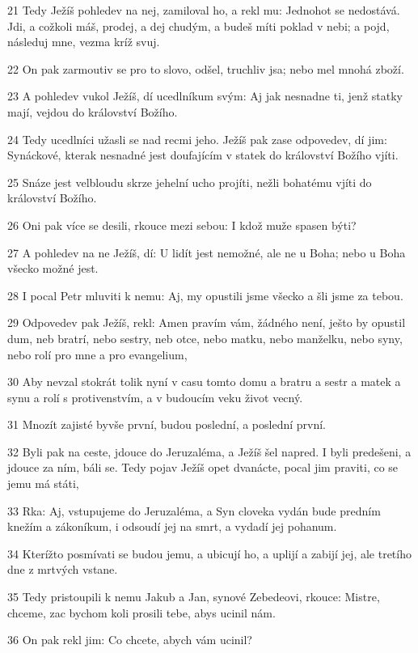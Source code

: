 \par 21 Tedy Ježíš pohledev na nej, zamiloval ho, a rekl mu: Jednohot se nedostává. Jdi, a cožkoli máš, prodej, a dej chudým, a budeš míti poklad v nebi; a pojd, následuj mne, vezma kríž svuj.
\par 22 On pak zarmoutiv se pro to slovo, odšel, truchliv jsa; nebo mel mnohá zboží.
\par 23 A pohledev vukol Ježíš, dí ucedlníkum svým: Aj jak nesnadne ti, jenž statky mají, vejdou do království Božího.
\par 24 Tedy ucedlníci užasli se nad recmi jeho. Ježíš pak zase odpovedev, dí jim: Synáckové, kterak nesnadné jest doufajícím v statek do království Božího vjíti.
\par 25 Snáze jest velbloudu skrze jehelní ucho projíti, nežli bohatému vjíti do království Božího.
\par 26 Oni pak více se desili, rkouce mezi sebou: I kdož muže spasen býti?
\par 27 A pohledev na ne Ježíš, dí: U lidít jest nemožné, ale ne u Boha; nebo u Boha všecko možné jest.
\par 28 I pocal Petr mluviti k nemu: Aj, my opustili jsme všecko a šli jsme za tebou.
\par 29 Odpovedev pak Ježíš, rekl: Amen pravím vám, žádného není, ješto by opustil dum, neb bratrí, nebo sestry, neb otce, nebo matku, nebo manželku, nebo syny, nebo rolí pro mne a pro evangelium,
\par 30 Aby nevzal stokrát tolik nyní v casu tomto domu a bratru a sestr a matek a synu a rolí s protivenstvím, a v budoucím veku život vecný.
\par 31 Mnozít zajisté byvše první, budou poslední, a poslední první.
\par 32 Byli pak na ceste, jdouce do Jeruzaléma, a Ježíš šel napred. I byli predešeni, a jdouce za ním, báli se. Tedy pojav Ježíš opet dvanácte, pocal jim praviti, co se jemu má státi,
\par 33 Rka: Aj, vstupujeme do Jeruzaléma, a Syn cloveka vydán bude predním knežím a zákoníkum, i odsoudí jej na smrt, a vydadí jej pohanum.
\par 34 Kterížto posmívati se budou jemu, a ubicují ho, a uplijí a zabijí jej, ale tretího dne z mrtvých vstane.
\par 35 Tedy pristoupili k nemu Jakub a Jan, synové Zebedeovi, rkouce: Mistre, chceme, zac bychom koli prosili tebe, abys ucinil nám.
\par 36 On pak rekl jim: Co chcete, abych vám ucinil?
